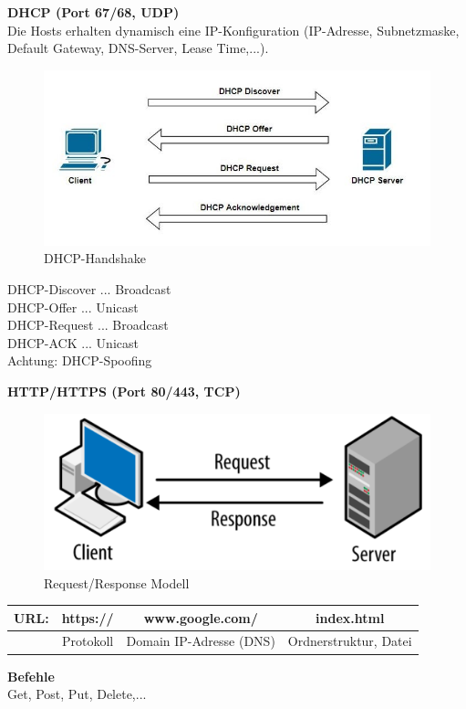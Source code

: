 \textbf{DHCP (Port 67/68, UDP)}\\
Die Hosts erhalten dynamisch eine IP-Konfiguration (IP-Adresse, Subnetzmaske, Default Gateway, DNS-Server, Lease Time,...).

\begin{figure}[H]
	\centering
	\includegraphics[width=0.8\linewidth]{figures/dhcp_handshake.jpg}
	\caption{DHCP-Handshake}
\end{figure}
DHCP-Discover ... Broadcast \\
DHCP-Offer ... Unicast \\
DHCP-Request ... Broadcast \\
DHCP-ACK ... Unicast \\ 

Achtung: DHCP-Spoofing

\textbf{HTTP/HTTPS (Port 80/443, TCP)}
\begin{figure}[H]
	\centering
	\includegraphics[width=0.8\linewidth]{figures/request_response.png}
	\caption{Request/Response Modell}
\end{figure}

\begin{table}[H]
	\begin{tabular}{c|c|c|c}
		URL: & https:// & www.google.com/ & index.html \\
		\hline
		& Protokoll & Domain IP-Adresse (DNS) & Ordnerstruktur, Datei
	\end{tabular}
\end{table}

\textbf{Befehle} \\
Get, Post, Put, Delete,...


